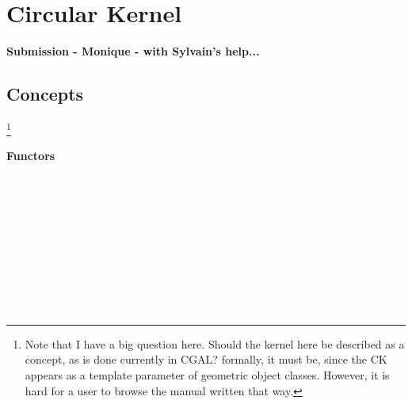 \chapter{Circular Kernel}

\textbf{Submission - Monique - with Sylvain's help...}


\section*{Concepts}

\footnote{Note that I have a big question here. Should the kernel here
be described as a concept, as is done currently in CGAL? formally, it
must be, since the CK appears as a template parameter of geometric
object classes. However, it is hard for a user to browse the manual
written that way.}




	\subsubsection*{Functors} 

\\
\\

\\
\\
\\

\\
\\
\\

